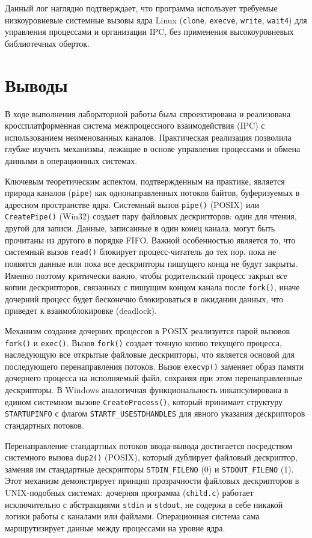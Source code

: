 \documentclass[pdf, unicode, 12pt, a4paper, oneside, fleqn]{article}
\begin{document}
Данный лог наглядно подтверждает, что программа использует требуемые низкоуровневые системные вызовы ядра Linux (\texttt{clone}, \texttt{execve}, \texttt{write}, \texttt{wait4}) для управления процессами и организации IPC, без применения высокоуровневых библиотечных оберток.

\section{Выводы}

В ходе выполнения лабораторной работы была спроектирована и реализована кроссплатформенная система межпроцессного взаимодействия (IPC) с использованием неименованных каналов. Практическая реализация позволила глубже изучить механизмы, лежащие в основе управления процессами и обмена данными в операционных системах.

Ключевым теоретическим аспектом, подтвержденным на практике, является природа каналов (\texttt{pipe}) как однонаправленных потоков байтов, буферизуемых в адресном пространстве ядра. Системный вызов \texttt{pipe()} (POSIX) или \texttt{CreatePipe()} (Win32) создает пару файловых дескрипторов: один для чтения, другой для записи. Данные, записанные в один конец канала, могут быть прочитаны из другого в порядке FIFO. Важной особенностью является то, что системный вызов \texttt{read()} блокирует процесс-читатель до тех пор, пока не появятся данные или пока все дескрипторы пишущего конца не будут закрыты. Именно поэтому критически важно, чтобы родительский процесс закрыл \textit{все} копии дескрипторов, связанных с пишущим концом канала после \texttt{fork()}, иначе дочерний процесс будет бесконечно блокироваться в ожидании данных, что приведет к взаимоблокировке (deadlock).

Механизм создания дочерних процессов в POSIX реализуется парой вызовов \texttt{fork()} и \texttt{exec()}. Вызов \texttt{fork()} создает точную копию текущего процесса, наследующую все открытые файловые дескрипторы, что является основой для последующего перенаправления потоков. Вызов \texttt{execvp()} заменяет образ памяти дочернего процесса на исполняемый файл, сохраняя при этом перенаправленные дескрипторы. В Windows аналогичная функциональность инкапсулирована в едином системном вызове \texttt{CreateProcess()}, который принимает структуру \texttt{STARTUPINFO} с флагом \texttt{STARTF\_USESTDHANDLES} для явного указания дескрипторов стандартных потоков.

Перенаправление стандартных потоков ввода-вывода достигается посредством системного вызова \texttt{dup2()} (POSIX), который дублирует файловый дескриптор, заменяя им стандартные дескрипторы \texttt{STDIN\_FILENO} (0) и \texttt{STDOUT\_FILENO} (1). Этот механизм демонстрирует принцип прозрачности файловых дескрипторов в UNIX-подобных системах: дочерняя программа (\texttt{child.c}) работает исключительно с абстракциями \texttt{stdin} и \texttt{stdout}, не содержа в себе никакой логики работы с каналами или файлами. Операционная система сама маршрутизирует данные между процессами на уровне ядра.
\end{document}
